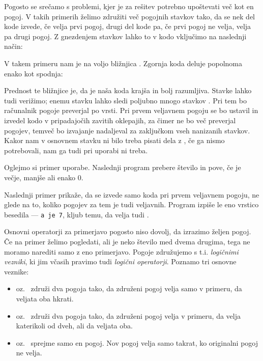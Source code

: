 
Pogosto se srečamo s problemi, kjer je za rešitev potrebno upoštevati več kot
en pogoj.
V takih primerih želimo združiti več pogojnih stavkov tako, da se nek del kode
izvede, če velja prvi pogoj, drugi del kode pa, če prvi pogoj ne velja, velja pa
drugi pogoj.
Z gnezdenjem stavkov lahko to v kodo vključimo na naslednji način:


V takem primeru nam je na voljo bližnjica .
Zgornja koda deluje popolnoma enako kot spodnja:


Prednost te bližnjice je, da je naša koda krajša in bolj razumljiva.
Stavke  lahko tudi verižimo; enemu  stavku lahko sledi
poljubno mnogo stavkov .
Pri tem bo računalnik pogoje preverjal po vrsti.
Pri prvem veljavnem pogoju se bo ustavil in izvedel kodo v pripadajočih zavitih
oklepajih, za čimer ne bo več preverjal pogojev, temveč bo izvajanje nadaljeval
za zaključkom vseh nanizanih stavkov.
Kakor nam v osnovnem  stavku ni bilo treba pisati dela z ,
če ga nismo potrebovali, nam ga tudi pri uporabi  ni treba.

Oglejmo si primer uporabe.
Naslednji program prebere število in pove, če je večje, manjše ali enako 0.


Naslednji primer prikaže, da se izvede samo koda pri prvem veljavnem pogoju, ne
glede na to, koliko pogojev za tem je tudi veljavnih.
Program izpiše le eno vrstico besedila --- \verb+a je 7+, kljub temu, da velja
tudi .



Osnovni operatorji za primerjavo pogosto niso dovolj, da izrazimo željen pogoj.
Če na primer želimo pogledati, ali je neko število med dvema drugima, tega ne
moramo narediti samo z eno primerjavo.
Pogoje združujemo s t.i. \emph{logičnimi vezniki}, ki jim včasih pravimo tudi
\emph{logični operatorji}.
Poznamo tri osnovne veznike:
\begin{itemize}
\item {} oz.~\koda{&&} združi dva pogoja tako, da združeni pogoj velja
  samo v primeru, da veljata oba hkrati.
\item {} oz.~\koda{||} združi dva pogoja tako, da združeni pogoj velja
  v primeru, da velja katerikoli od dveh, ali da veljata oba.
\item {} oz.~\koda{!} sprejme samo en pogoj.
  Nov pogoj velja samo takrat, ko originalni pogoj ne velja.
\end{itemize}


